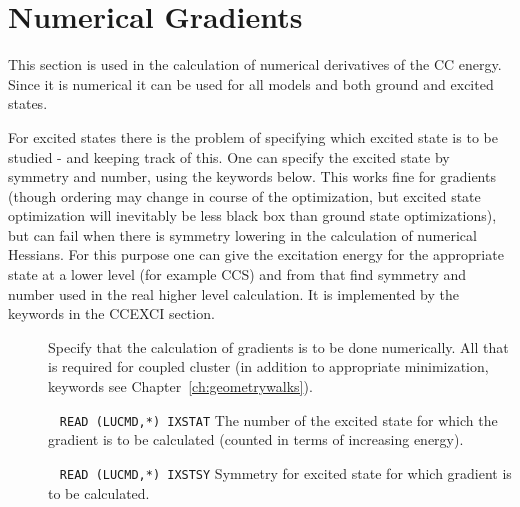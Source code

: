 %
\section{Numerical Gradients }\label{sec:ccgr}
%

This section is used in the calculation of numerical derivatives
of the CC energy. Since it is numerical it can be used for all models
and both ground and excited states.

For excited states there is the problem of specifying 
which excited state is to be studied - and keeping track of this.
One can specify the excited state by symmetry and number, using the keywords below.
This works fine for gradients (though ordering may change in course of the
optimization, but excited state optimization will inevitably be less black box
than ground state optimizations), but can fail when there is symmetry lowering
in the calculation of numerical Hessians. 
For this purpose one can give the excitation energy for the 
appropriate state at a lower level 
(for example CCS) and from that find symmetry and number used 
in the real higher level calculation.
It is implemented by the keywords in the CCEXCI section.

\begin{description}

\item[] 

Specify that the calculation of gradients is to be done numerically.
All that is required for coupled cluster (in addition to appropriate 
minimization, keywords see Chapter~\ref{ch:geometrywalks}).

\item[] \verb| | \newline
\verb|READ (LUCMD,*) IXSTAT|\newline
The number of the excited state for which the  gradient is to be calculated 
(counted in terms of increasing energy).

\item[]  \verb| | \newline
\verb|READ (LUCMD,*) IXSTSY|\newline
Symmetry for excited state for which gradient is to be calculated.


\end{description}
